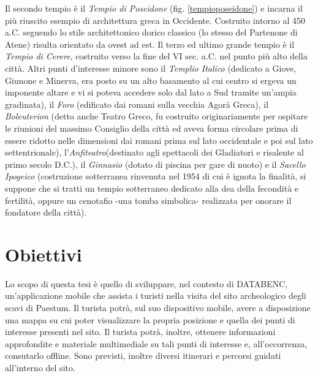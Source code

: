 Il secondo tempio è il \emph{Tempio di Poseidone} (fig. \ref{tempioposeidone}) e incarna il più riuscito esempio di architettura greca in Occidente. Costruito intorno al 450 a.C. seguendo lo stile architettonico dorico classico (lo stesso del Partenone di Atene) risulta orientato da ovest ad est. Il terzo ed ultimo grande tempio è il \emph{Tempio di Cerere}, costruito verso la fine del VI sec. a.C. nel punto più alto della città. Altri punti d'interesse minore sono il \emph{Templio Italico} (dedicato a Giove, Giunone e Minerva, era posto su un alto basamento al cui centro si ergeva un imponente altare e vi si poteva accedere solo dal lato a Sud tramite un'ampia gradinata), il \emph{Foro} (edificato dai romani sulla vecchia Agorà Greca), il \emph{Boleuterion} (detto anche Teatro Greco, fu costruito originariamente per ospitare le riunioni del massimo Consiglio della città ed aveva forma circolare prima di essere ridotto nelle dimensioni dai romani prima sul lato occidentale e poi sul lato settentrionale), l'\emph{Anfiteatro}(destinato agli spettacoli dei Gladiatori e risalente al primo secolo D.C.), il \emph{Ginnasio} (dotato di piscina per gare di nuoto) e il \emph{Sacello Ipogeico} (costruzione sotterranea rinvenuta nel 1954 di cui è ignota la finalità, si suppone che si tratti un tempio sotterraneo dedicato alla dea della fecondità e fertilità, oppure un cenotafio -una tomba simbolica- realizzata per onorare il fondatore della città).
\section{Obiettivi}
Lo scopo di questa tesi è quello di sviluppare, nel contesto di DATABENC, un'applicazione mobile che assista i turisti nella visita del sito archeologico degli scavi di Paestum.
Il turista potrà, sul suo dispositivo mobile, avere a disposizione una mappa su cui poter visualizzare la propria posizione e quella dei punti di interesse presenti nel sito.
Il turista potrà, inoltre, ottenere informazioni approfondite e materiale multimediale su tali punti di interesse e, all'occorrenza, consutarlo offline.
Sono previsti, inoltre diversi itinerari e percorsi guidati all'interno del sito.






\clearpage{\pagestyle{empty}\cleardoublepage}


